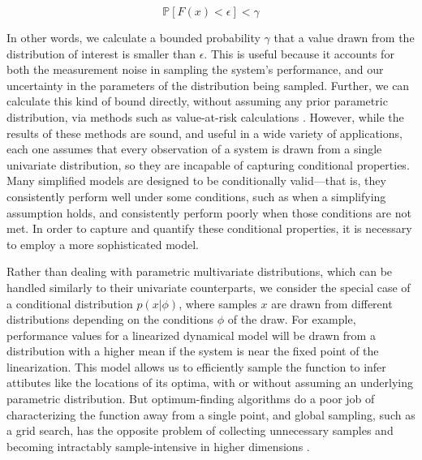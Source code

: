 \documentclass[letterpaper, 10 pt, conference]{ieeeconf}
\begin{document}
\begin{equation}
    \mathbb{P}[F(x)<\epsilon]<\gamma \nonumber
\end{equation}

In other words, we calculate a bounded probability $\gamma$ that a value drawn from the distribution of interest is smaller than $\epsilon$. This is useful because it accounts for both the measurement noise in sampling the system's performance, and our uncertainty in the parameters of the distribution being sampled. Further, we can calculate this kind of bound directly, without assuming any prior parametric distribution, via methods such as value-at-risk calculations \cite{jorion06,kuester06}. However, while the results of these methods are sound, and useful in a wide variety of applications, each one assumes that every observation of a system is drawn from a single univariate distribution, so they are incapable of capturing conditional properties. Many simplified models are designed to be conditionally valid---that is, they consistently perform well under some conditions, such as when a simplifying assumption holds, and consistently perform poorly when those conditions are not met. In order to capture and quantify these conditional properties, it is necessary to employ a more sophisticated model.
\newline

Rather than dealing with parametric multivariate distributions, which can be handled similarly to their univariate counterparts, we consider the special case of a conditional distribution $p(x|\phi)$, where samples $x$ are drawn from different distributions depending on the conditions $\phi$ of the draw. For example, performance values for a linearized dynamical model will be drawn from a distribution with a higher mean if the system is near the fixed point of the linearization. This model allows us to efficiently sample the function to infer attibutes like the locations of its optima, with \cite{chowdhury17}\cite{srinivas09} or without \cite{bonyadi17}\cite{akella22} assuming an underlying parametric distribution. But optimum-finding algorithms do a poor job of characterizing the function away from a single point, and global sampling, such as a grid search, has the opposite problem of collecting unnecessary samples and becoming intractably sample-intensive in higher dimensions \cite{chen15}\cite{he20}.
\end{document}
